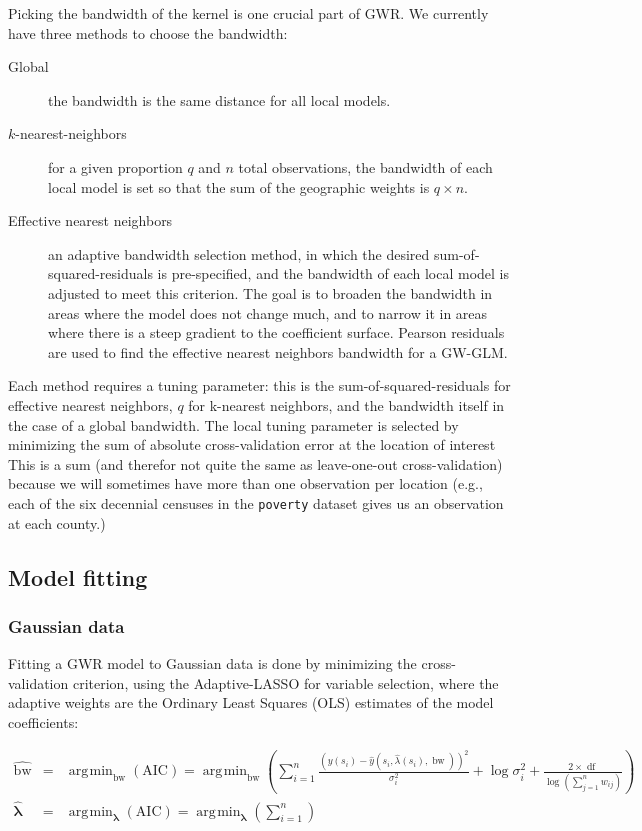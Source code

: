 \documentclass[authoryear, review, 11pt]{elsarticle}
\DeclareMathOperator*{\argmin}{\arg\!\min}
\DeclareMathOperator*{\bw}{\mbox{bw}}
\DeclareMathOperator*{\df}{\mbox{df}}
\begin{document}
		Picking the bandwidth of the kernel is one crucial part of GWR. We currently have three methods to choose the bandwidth:
		\begin{description}
			\item[Global] the bandwidth is the same distance for all local models.
			\item[$k$-nearest-neighbors] for a given proportion $q$ and $n$ total observations, the bandwidth of each local model is set so that the sum of the geographic weights is $q \times n$.
			\item[Effective nearest neighbors] an adaptive bandwidth selection method, in which the desired sum-of-squared-residuals is pre-specified, and the bandwidth of each local model is adjusted to meet this criterion. The goal is to broaden the bandwidth in areas where the model does not change much, and to narrow it in areas where there is a steep gradient to the coefficient surface. Pearson residuals are used to find the effective nearest neighbors bandwidth for a GW-GLM.
		\end{description}
		
		Each method requires a tuning parameter: this is the sum-of-squared-residuals for effective nearest neighbors, $q$ for k-nearest neighbors, and the bandwidth itself in the case of a global bandwidth. The local tuning parameter is selected by minimizing the sum of absolute cross-validation error at the location of interest This is a sum (and therefor not quite the same as leave-one-out cross-validation) because we will sometimes have more than one observation per location (e.g., each of the six decennial censuses in the \verb~poverty~ dataset gives us an observation at each county.)\\
		
		
	\subsection{Model fitting}
		\subsubsection{Gaussian data}
		Fitting a GWR model to Gaussian data is done by minimizing the cross-validation criterion, using the Adaptive-LASSO for variable selection, where the adaptive weights are the Ordinary Least Squares (OLS) estimates of the model coefficients:

		 \begin{eqnarray*}
			\hat{\bw} &=& \argmin_{\text{bw}} \left( \mbox{AIC} \right)  = \argmin_{\text{bw}} \left( \sum_{i = 1}^n \frac{ \left(y(s_i)-\hat{y}\left(s_i, \hat{\lambda}(s_i), \bw \right) \right)^2 }{\sigma_i^2} + \log{\sigma_i^2} + \frac{2 \times \df}{\log{ \left(\sum_{j=1}^n w_{ij} \right) }} \right)\\	
			\hat{\bm{\lambda}} &=& \argmin_{\bm{\lambda}} \left( \mbox{AIC} \right)  = \argmin_{\bm{\lambda}} \left( \sum_{i = 1}^n \right) 
		\end{eqnarray*}
		
\end{document}
